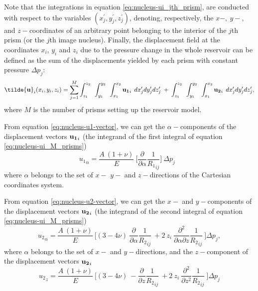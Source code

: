 \documentclass[journal abbreviation, manuscript]{copernicus}
\begin{document}
Note that the integrations in equation \ref{eq:nucleus-ui_jth_prism}, are conducted with respect to the variables $(x^{\prime}_{j}, y^{\prime}_{j}, z^{\prime}_{j})$, denoting, respectively, the
$x-, \: y-$, and $z-$coordinates of an arbitrary point belonging to the interior
of the $j$th prism (or the $j$th image nucleus).
Finally, the displacement field at the coordinates $x_i$, $y_i$  and $z_i$ due to the pressure change in the whole reservoir can be defined as the sum of the displacements yielded by each prism with constant pressure $\Delta p_{j}$:
\begin{equation}
{\bf{\tilde{u}}}_{i} (x_i,y_i,z_i) = \sum_{j=1}^{M} 
\int_{z_1}^{z_2} \:\:
\int_{y_1}^{y_2} \:\: 
\int_{x_1}^{x_2} 
{\bf{u_{1}}}_{i} \: \:  dx^{\prime}_j dy^{\prime}_j dz^{\prime}_j 
\: + \: 
\int_{z_1}^{z_2} \:\:
\int_{y_1}^{y_2} \:\: 
\int_{x_1}^{x_2} 
{\bf{u_{2}}}_{i} \:\:  dx^{\prime}_j dy^{\prime}_j dz^{\prime}_j, 
\label{eq:nucleus-ui_M_prisms}
\end{equation}
where $M$ is the number of prisms setting up the reservoir model.

From equation \ref{eq:nucleus-u1-vector},  we can get the   
$\alpha-$components of the displacement vectors ${\bf{u_{1}}}_{i}$  (the integrand of the first integral of equation \ref{eq:nucleus-ui_M_prisms})
\begin{equation}
{u_{1}}_\alpha =  \frac{A  \: (1 + \nu)}{E} \: \Bigg[  \frac{\partial }{\partial \alpha} {\frac{1}{{R_1}_{ij}}} \Bigg] \: \Delta p_{j} \:\:\:  
\label{eq:u1_alpha_component}
\end{equation}
where $\alpha$  belongs to the set of $ x-$ $y-$ and $z-$directions of the Cartesian coordinates system.

From equation  \ref{eq:nucleus-u2-vector}, we can get the $ x-$ and $y-$components of the displacement vectors ${\bf{u_{2}}}_{i}$  (the integrand of the second integral of equation \ref{eq:nucleus-ui_M_prisms})
\begin{equation}
{u_{2}}_\alpha =  \frac{A  \: (1 + \nu)}{E} \: \Bigg[ 
(3  - 4 \nu)    \: \frac{\partial }{\partial \alpha} {\frac{1}{{R_2}_{ij}}}\: 
+ 2 \: z_{i} \:  
\frac{\partial^{2}  }{\partial \alpha \partial z} {\frac{1}{{R_2}_{ij}}}  \: \Bigg]
\Delta p_{j} ,
\label{eq:u2_alpha_component}
\end{equation}
where  $\alpha$  belongs to the set of $ x-$ and $y-$directions, and the $z-$component of the displacement vectors ${\bf{u_{2}}}_{i}$  
\begin{equation}
{u_{2}}_z =  \frac{A  \: (1 + \nu)}{E} \: \Bigg[ 
(3  - 4 \nu)    \: - \frac{\partial }{\partial z} {\frac{1}{{R_2}_{ij}}}\: 
+ 2 \: z_{i} \:  
\frac{\partial^{2}  }{\partial z^{2}} {\frac{1}{{R_2}_{ij}}}  \: \Bigg]
\Delta p_{j}
\label{eq:u2_z_component}
\end{equation}
\end{document}
